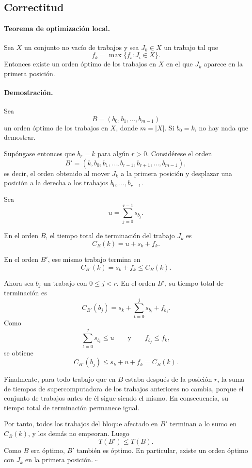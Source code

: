 \documentclass[11pt]{article}
\begin{document}
\subsection*{Correctitud}

\paragraph{Teorema de optimización local.}
Sea \(X\) un conjunto no vacío de trabajos y sea \(J_k \in X\) un trabajo tal que
\[
f_k=\max\{f_i : J_i\in X\}.
\]
Entonces existe un orden óptimo de los trabajos en \(X\) en el que \(J_k\) aparece en
la primera posición.

\paragraph{Demostración.}
Sea
\[
B=(b_0,b_1,\dots,b_{m-1})
\]
un orden óptimo de los trabajos en \(X\), donde \(m=|X|\). Si \(b_0=k\), no hay nada
que demostrar.

Supóngase entonces que \(b_r=k\) para algún \(r>0\). Considérese el orden
\[
B'=(k,b_0,b_1,\dots,b_{r-1},b_{r+1},\dots,b_{m-1}),
\]
es decir, el orden obtenido al mover \(J_k\) a la primera posición y desplazar una
posición a la derecha a los trabajos \(b_0,\dots,b_{r-1}\).

Sea
\[
u=\sum_{j=0}^{r-1} s_{b_j}.
\]

En el orden \(B\), el tiempo total de terminación del trabajo \(J_k\) es
\[
C_B(k)=u+s_k+f_k.
\]

En el orden \(B'\), ese mismo trabajo termina en
\[
C_{B'}(k)=s_k+f_k\leq C_B(k).
\]

Ahora sea \(b_j\) un trabajo con \(0\leq j<r\). En el orden \(B'\), su tiempo total de
terminación es
\[
C_{B'}(b_j)=s_k+\sum_{t=0}^{j} s_{b_t}+f_{b_j}.
\]
Como
\[
\sum_{t=0}^{j} s_{b_t}\leq u
\qquad\text{y}\qquad
f_{b_j}\leq f_k,
\]
se obtiene
\[
C_{B'}(b_j)\leq s_k+u+f_k=C_B(k).
\]

Finalmente, para todo trabajo que en \(B\) estaba después de la posición \(r\), la suma
de tiempos de supercomputadora de los trabajos anteriores no cambia, porque el conjunto
de trabajos antes de él sigue siendo el mismo. En consecuencia, su tiempo total de
terminación permanece igual.

Por tanto, todos los trabajos del bloque afectado en \(B'\) terminan a lo sumo en
\(C_B(k)\), y los demás no empeoran. Luego
\[
T(B')\leq T(B).
\]
Como \(B\) era óptimo, \(B'\) también es óptimo. En particular, existe un orden óptimo
con \(J_k\) en la primera posición. \(\square\)
\end{document}
